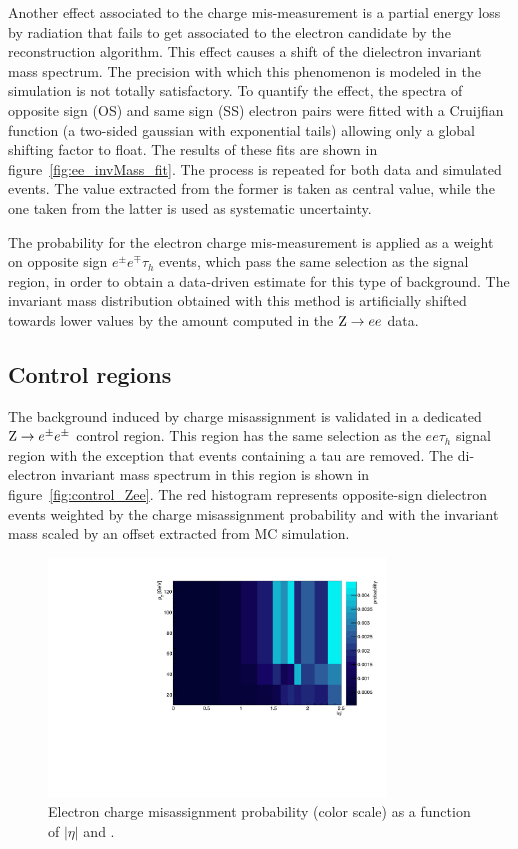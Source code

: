 Another effect associated to the charge mis-measurement is a partial energy loss by radiation that fails to get associated to the electron candidate by the reconstruction algorithm.
This effect causes a shift of the dielectron invariant mass spectrum.
The precision with which this phenomenon is modeled in the simulation is not totally satisfactory. To quantify the effect, the spectra of opposite sign (OS) and same sign (SS) electron pairs were fitted with a Cruijfian function (a two-sided gaussian with exponential tails) allowing only a global shifting factor to float. The results of these fits are shown in figure~\ref{fig:ee_invMass_fit}. The process is repeated for both data and simulated events. The value extracted from the former is taken as central value, while the one taken from the latter is used as systematic uncertainty.

The probability for the electron charge mis-measurement is applied as a weight on opposite sign $e^\pm e^\mp \tau_h$ events, which pass the same selection as the signal region, in order to obtain a data-driven estimate for this type of background. The invariant mass distribution obtained with this method is artificially shifted towards lower values 
by the amount computed in the $\mathrm{Z} \rightarrow ee$ data.

\subsection{Control regions}

The background induced by charge misassignment is validated in a dedicated $\mathrm{Z} \rightarrow e^\pm e^\pm$ control region.
This region has the same selection as the $ee\tau_h$ signal region with the exception that events containing a tau are removed.
The di-electron invariant mass spectrum in this region is shown in figure~\ref{fig:control_Zee}. The red histogram represents opposite-sign dielectron events weighted by the charge misassignment probability and with the invariant mass scaled by an offset extracted from MC simulation.

\begin{figure}
  \begin{center}
  \includegraphics[width=0.8\textwidth]{4_Analisys/pics/8TeV/fakerate_fits/charge_flip_prob_map_eid12Medium_h2taucuts.pdf}
  \caption{
  Electron charge misassignment probability (color scale) as a function of $|\eta|$ and \pT.}
  \label{fig:charge_flip_prob_map}
  \end{center}
\end{figure}


